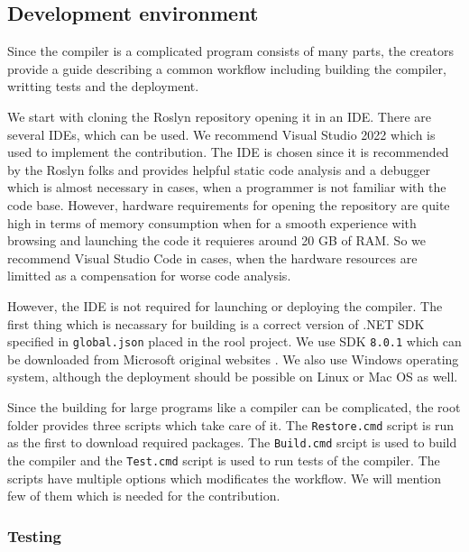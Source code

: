 \subsection{Development environment}

Since the compiler is a complicated program consists of many parts, the creators provide a guide \cite{online:roslynGuide} describing a common workflow including building the compiler, writting tests and the deployment.
\par
We start with cloning the Roslyn repository \cite{online:roslynRepo} opening it in an IDE.
There are several IDEs, which can be used.
We recommend Visual Studio 2022 \cite{online:vs} which is used to implement the contribution.
The IDE is chosen since it is recommended by the Roslyn folks and provides helpful static code analysis and a debugger which is almost necessary in cases, when a programmer is not familiar with the code base.
However, hardware requirements for opening the repository are quite high in terms of memory consumption when for a smooth experience with browsing and launching the code it requieres around 20 GB of RAM.
So we recommend Visual Studio Code \cite{online:vsCode} in cases, when the hardware resources are limitted as a compensation for worse code analysis.
\par
However, the IDE is not required for launching or deploying the compiler.
The first thing which is necassary for building is a correct version of .NET SDK specified in \texttt{global.json} placed in the rool project.
We use SDK \texttt{8.0.1} which can be downloaded from Microsoft original websites \cite{online:sdk}.
We also use Windows operating system, although the deployment should be possible on Linux or Mac OS as well.
\par
Since the building for large programs like a compiler can be complicated, the root folder provides three scripts which take care of it.
The \texttt{Restore.cmd} script is run as the first to download required packages.
The \texttt{Build.cmd} srcipt is used to build the compiler and the \texttt{Test.cmd} script is used to run tests of the compiler.
The scripts have multiple options which modificates the workflow.
We will mention few of them which is needed for the contribution.

\subsubsection{Testing}

